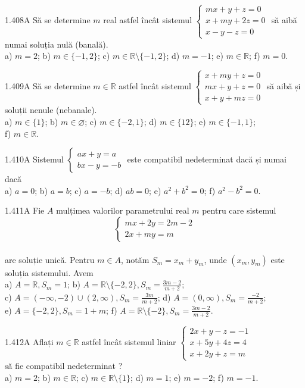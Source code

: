\documentclass[11pt]{article}
\begin{document}
1.408A Să se determine $m$ real astfel încât sistemul $\left\{\begin{array}{l}m x+y+z=0 \\ x+m y+2 z=0 \\ x-y-z=0\end{array}\right.$ să aibă numai soluția nulă (banală).\\ a) $m=2$; b) $m \in\{-1,2\}$; c) $m \in \mathbb{R} \setminus\{-1,2\}$; d) $m=-1$; e) $m \in \mathbb{R}$; f) $m=0$.

1.409A Să se determine $m \in \mathbb{R}$ astfel încât sistemul $\left\{\begin{array}{l}x+m y+z=0 \\ m x+y+z=0 \\ x+y+m z=0\end{array}\right.$ să aibă și soluții nenule (nebanale).\\ a) $m \in\{1\}$; b) $m \in \varnothing$; c) $m \in\{-2,1\}$; d) $m \in\{12\}$; e) $m \in\{-1,1\}$;\\ f) $m \in \mathbb{R}$.

1.410A Sistemul $\left\{\begin{array}{l}a x+y=a \\ b x-y=-b\end{array}\right.$ este compatibil nedeterminat dacă și numai dacă\\ a) $a=0$; b) $a=b$; c) $a=-b$; d) $a b=0$; e) $a^{2}+b^{2}=0$; f) $a^{2}-b^{2}=0$.

1.411A Fie $A$ mulțimea valorilor parametrului real $m$ pentru care sistemul $$\left\{\begin{array}{l}m x+2 y=2 m-2 \\2 x+m y=m\end{array}\right.$$\\ are soluție unică. Pentru $m \in A$, notăm $S_{m}=x_{m}+y_{m}$, unde $\left(x_{m}, y_{m}\right)$ este soluția sistemului. Avem\\ a) $A=\mathbb{R}, S_{m}=1$; b) $A=\mathbb{R} \setminus\{-2,2\}, S_{m}=\frac{3 m-2}{m+2}$;\\ c) $A=(-\infty,-2) \cup(2, \infty), S_{m}=\frac{3 m}{m+2}$; d) $A=(0, \infty), S_{m}=\frac{-2}{m+2}$;\\ e) $A=\{-2,2\}, S_{m}=1+m$; f) $A=\mathbb{R} \setminus\{-2\}, S_{m}=\frac{3 m-2}{m+2}$.

1.412A Aflați $m \in \mathbb{R}$ astfel încât sistemul liniar $\left\{\begin{array}{l}2 x+y-z=-1 \\ x+5 y+4 z=4 \\ x+2 y+z=m\end{array}\right.$\\ să fie compatibil nedeterminat ?\\ a) $m=2$; b) $m \in \mathbb{R}$; c) $m \in \mathbb{R} \setminus\{1\}$; d) $m=1$; e) $m=-2$; f) $m=-1$. 
\end{document}
